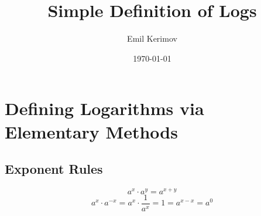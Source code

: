 \documentclass[a4paper]{article}
\title{Simple Definition of Logs}
\author{Emil Kerimov}
\date{\today}
\begin{document}
\maketitle




\section{Defining Logarithms via Elementary Methods}\label{log:logs simple}

\subsection{Exponent Rules}\label{log:Exponating rules}
\begin{equation}\label{log:a_x_times_a_b}
a^{x} \cdot a^{y}  = a^{x+y}
\end{equation}
\begin{equation}\label{log:a_0}
a^{x} \cdot a^{-x} = a^{x} \cdot \frac{1}{a^{x}} = 1 = a^{x-x} = a^{0}
\end{equation}
\end{document}
